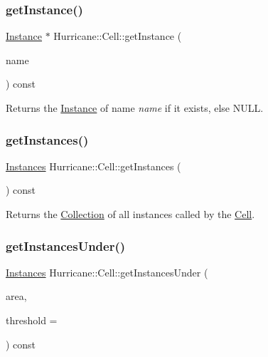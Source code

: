 \subsubsection{\texorpdfstring{get\+Instance()}{getInstance()}}
{\footnotesize\ttfamily \mbox{\hyperlink{classHurricane_1_1Instance}{Instance}} $\ast$ Hurricane\+::\+Cell\+::get\+Instance (\begin{DoxyParamCaption}\item[{const \mbox{\hyperlink{classHurricane_1_1Name}{Name}} \&}]{name }\end{DoxyParamCaption}) const\hspace{0.3cm}{\ttfamily [inline]}}

Returns the \mbox{\hyperlink{classHurricane_1_1Instance}{Instance}} of name {\itshape name} if it exists, else {\ttfamily N\+U\+LL}. \mbox{\label{classHurricane_1_1Cell_aa85b3992431b672827167c5d9cb622f2}} 
\subsubsection{\texorpdfstring{get\+Instances()}{getInstances()}}
{\footnotesize\ttfamily \mbox{\hyperlink{namespaceHurricane_ac9436b03a2926f34ad6863deae2baadc}{Instances}} Hurricane\+::\+Cell\+::get\+Instances (\begin{DoxyParamCaption}{ }\end{DoxyParamCaption}) const\hspace{0.3cm}{\ttfamily [inline]}}

Returns the \mbox{\hyperlink{classHurricane_1_1Collection}{Collection}} of all instances called by the \mbox{\hyperlink{classHurricane_1_1Cell}{Cell}}. \mbox{\label{classHurricane_1_1Cell_a3af933175d318b205d94adaf92ba0499}} 
\subsubsection{\texorpdfstring{get\+Instances\+Under()}{getInstancesUnder()}}
{\footnotesize\ttfamily \mbox{\hyperlink{namespaceHurricane_ac9436b03a2926f34ad6863deae2baadc}{Instances}} Hurricane\+::\+Cell\+::get\+Instances\+Under (\begin{DoxyParamCaption}\item[{const \mbox{\hyperlink{classHurricane_1_1Box}{Box}} \&}]{area,  }\item[{\mbox{\hyperlink{group__DbUGroup_ga4fbfa3e8c89347af76c9628ea06c4146}{Db\+U\+::\+Unit}}}]{threshold = {} }\end{DoxyParamCaption}) const}

